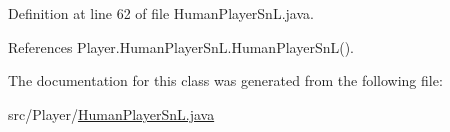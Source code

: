 Definition at line 62 of file Human\+Player\+Sn\+L.\+java.



References Player.\+Human\+Player\+Sn\+L.\+Human\+Player\+Sn\+L().



The documentation for this class was generated from the following file\+:\begin{DoxyCompactItemize}
\item 
src/\+Player/\hyperlink{_human_player_sn_l_8java}{Human\+Player\+Sn\+L.\+java}\end{DoxyCompactItemize}
